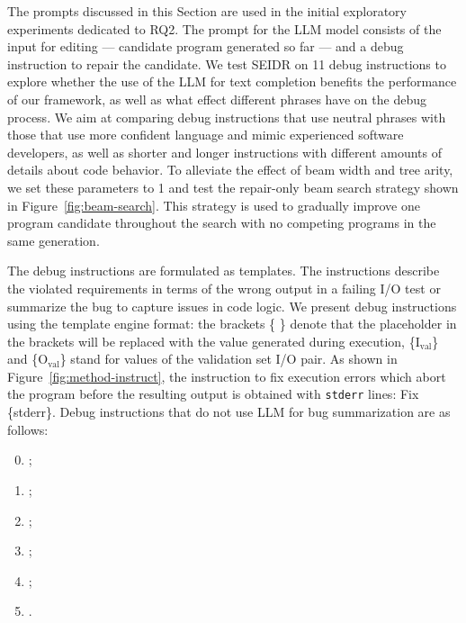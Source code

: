 The prompts discussed in this Section are used in the initial exploratory experiments dedicated to RQ2. 
The prompt for the LLM model consists of the input for editing --- candidate program generated so far --- and a debug instruction to repair the candidate. 
We test SEIDR on 11 debug instructions to explore whether the use of the LLM for text completion benefits the performance of our framework, as well as what effect different phrases have on the debug process. 
We aim at comparing debug instructions that use neutral phrases with those that use more confident language and mimic experienced software developers, as well as shorter and longer instructions with different amounts of details about code behavior.
To alleviate the effect of beam width and tree arity, we set these parameters to 1 and test the repair-only beam search strategy shown in Figure~\ref{fig:beam-search}. 
This strategy is used to gradually improve one program candidate throughout the search with no competing programs in the same generation. 

The debug instructions are formulated as templates. The instructions describe the violated requirements in terms of the wrong output in a failing I/O test or summarize the bug to capture issues in code logic.
We present debug instructions using the template engine format: the brackets \{ \} denote that the placeholder in the brackets will be replaced with the value generated during execution, \{I$_{\text{val}}$\} and \{O$_{\text{val}}$\} stand for values of the validation set I/O pair.
As shown in Figure~\ref{fig:method-instruct}, the instruction to fix execution errors which abort the program before the resulting output is obtained with \texttt{stderr} lines: Fix \{stderr\}. 
Debug instructions that do not use LLM for bug summarization are as follows:
\begin{enumerate}[label=S\arabic*]
\setcounter{enumi}{-1}
    \item \label{seidr:prompt-0} ;
    \item \label{seidr:prompt-1} ;
    \item \label{seidr:prompt-2} ;
    \item \label{seidr:prompt-3} ;
    \item \label{seidr:prompt-4} 
    ;
    \item \label{seidr:prompt-5} .
\end{enumerate}

